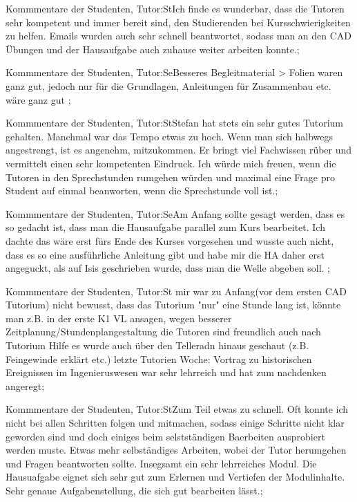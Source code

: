 \documentclass[10pt]{beamer}
\begin{document}
\begin{frame}[fragile]{Kommmentare der Studenten, Tutor:St}Ich finde es wunderbar, dass die Tutoren sehr kompetent und immer bereit sind, den Studierenden bei Kursschwierigkeiten zu helfen. Emails wurden auch sehr schnell beantwortet, sodass man an den CAD Übungen und der Hausaufgabe auch zuhause weiter arbeiten konnte.;
 \end{frame}
\begin{frame}[fragile]{Kommmentare der Studenten, Tutor:Se}Besseres Begleitmaterial   > Folien waren ganz gut, jedoch nur für die Grundlagen, Anleitungen für Zusammenbau etc. wäre ganz gut ;
 \end{frame}
\begin{frame}[fragile]{Kommmentare der Studenten, Tutor:St}Stefan hat stets ein sehr gutes Tutorium gehalten. Manchmal war das Tempo etwas zu hoch. Wenn man sich halbwegs angestrengt, ist es angenehm, mitzukommen. Er bringt viel Fachwissen rüber und vermittelt einen sehr kompetenten Eindruck. Ich würde mich freuen, wenn die Tutoren in den Sprechstunden rumgehen würden und maximal eine Frage pro Student auf einmal beanworten, wenn die Sprechstunde voll ist.;
 \end{frame}
\begin{frame}[fragile]{Kommmentare der Studenten, Tutor:Se}Am Anfang sollte gesagt werden, dass es so gedacht ist, dass man die Hausaufgabe parallel zum Kurs bearbeitet. Ich dachte das wäre erst fürs Ende des Kurses vorgesehen und wusste auch nicht, dass es so eine ausführliche Anleitung gibt und habe mir die HA daher erst angeguckt, als auf Isis geschrieben wurde, dass man die Welle abgeben soll. ;
 \end{frame}
\begin{frame}[fragile]{Kommmentare der Studenten, Tutor:St}   mir war zu Anfang(vor dem ersten CAD Tutorium) nicht bewusst, dass das Tutorium "nur" eine Stunde lang ist, könnte man z.B. in der erste K1 VL ansagen, wegen besserer Zeitplanung/Stundenplangestaltung     die Tutoren sind freundlich   auch nach Tutorium Hilfe   es wurde auch über den Telleradn hinaus geschaut (z.B. Feingewinde erklärt etc.)   letzte Tutorien Woche: Vortrag zu historischen Ereignissen im Ingenieruswesen war sehr lehrreich und hat zum nachdenken angeregt;
 \end{frame}
\begin{frame}[fragile]{Kommmentare der Studenten, Tutor:St}Zum Teil etwas zu schnell. Oft konnte ich nicht bei allen Schritten folgen und mitmachen, sodass einige Schritte nicht klar geworden sind und doch einiges beim selstständigen Baerbeiten ausprobiert werden muste. Etwas mehr selbständiges Arbeiten, wobei der Tutor herumgehen und Fragen beantworten sollte. Insegsamt ein sehr lehrreiches Modul. Die Hausuafgabe eignet sich sehr gut zum Erlernen und Vertiefen der Modulinhalte. Sehr genaue Aufgabenstellung, die sich gut bearbeiten lässt.;
 \end{frame}
\end{document}
